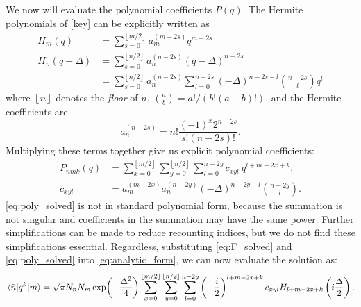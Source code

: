 \documentclass[aip, jcp, reprint, onecolumn, nofootinbib]{revtex4-2}
\begin{document}
We now will evaluate the polynomial coefficients $P(q)$.
The Hermite polynomials of \autoref{key} can be explicitly written as 
\begin{equation}
\begin{split}
	H_m(q) &= \sum_{s=0}^{\left\lfloor{m/2}\right\rfloor} a_m^{(m-2s)} q^{m-2s} \\
	H_n(q-\Delta) &= \sum_{s=0}^{\left\lfloor{n/2}\right\rfloor}
	a_n^{(n-2s)} (q-\Delta)^{n-2s} \\
		&= \sum_{s=0}^{\left\lfloor{n/2}\right\rfloor} a_n^{(n-2s)} \sum_{l=0}^{n-2s} \left(-\Delta\right)^{n-2s-l} \binom{n-2s}{l} q^l
\end{split}
\end{equation}
where $\left\lfloor n \right\rfloor$ denotes the \textit{floor} of $n$, $\binom{a}{b} = a! / (b!(a-b)!)$, and the Hermite coefficients are\cite{MorseFeshbach}
\begin{equation}
	a_n^{(n-2s)} = n! \frac{(-1)^x 2^{n-2s}}{s!(n-2s)!}.
\end{equation}
Multiplying these terms together give us explicit polynomial coefficients:
\begin{equation}\label{eq:poly_solved}
\begin{split}
	P_{nmk}(q) %
	&= \sum_{x=0}^{\left\lfloor{m/2}\right\rfloor} \sum_{y=0}^{\left\lfloor{n/2}\right\rfloor} \sum_{l=0}^{n-2y} c_{xyl} \ q^{l+m-2x+k}, \\
	c_{xyl} &= a_m^{(m-2x)} a_n^{(n-2y)} \left(-\Delta\right)^{n-2y-l} \binom{n-2y}{l}.
\end{split}
\end{equation}
\autoref{eq:poly_solved} is not in standard polynomial form, because the summation is not singular and coefficients in the summation may have the same power. 
Further simplifications can be made to reduce recounting indices, but we do not find these simplifications essential.
Regardless, substituting \autoref{eq:F_solved} and \autoref{eq:poly_solved} into \autoref{eq:analytic_form}, we can now evaluate the solution as:
\begin{equation}\label{eq:general_solution}
	\mel{\tilde{n}}{q^k}{m} = \sqrt{\pi} N_n N_m 
	\exp(-\frac{\Delta^2}{4}) \sum_{x=0}^{\left\lfloor{m/2}\right\rfloor} \sum_{y=0}^{\left\lfloor{n/2}\right\rfloor} \sum_{l=0}^{n-2y} \left( -\frac{i}{2} \right)^{l+m-2x+k} c_{xyl} H_{l+m-2x+k}\left(i\frac{\Delta}{2}\right).
\end{equation}
\end{document}
